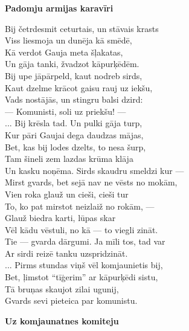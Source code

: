 \documentclass[14pt]{extarticle}
\begin{document}
{{{\bf Padomju armijas karavīri}

Bij četrdesmit ceturtais, un stāvais krasts\\
Viss liesmoja un dunēja kā smēdē,\\
Kā verdot Gauja meta šļakatas,\\
Un gāja tanki, žvadzot kāpurķēdēm.\\
Bij upe jāpārpeld, kaut nodreb sirds,\\
Kaut dzelme krācot gaisu rauj uz iekšu,\\
Vads nostājās, un stingru balsi dzird:\\
--- Komunisti, soli uz priekšu! ---\\
... Bij krēsla tad. Un pulki gāja turp,\\
Kur pāri Gaujai dega daudzas mājas,\\
Bet, kas bij lodes dzelts, to nesa šurp,\\
Tam šineli zem lazdas krūma klāja\\
Un kasku noņēma. Sirds skaudru smeldzi kur ---\\
Mirst gvards, bet sejā nav ne vēsts no mokām,\\
Vien roka glauž un cieši, cieši tur\\
To, ko pat mirstot neizlaiž no rokām, ---\\
Glauž biedra karti, lūpas skar\\
Vēl kādu vēstuli, no kā --- to viegli zināt.\\
Tie --- gvarda dārgumi. Ja mīli tos, tad var\\
Ar sirdi reizē tanku uzspridzināt.\\
... Pirms stundas viņš vēl komjaunietis bij,\\
Bet, ļimstot ``tīģerim'' ar kāpurķēdi sistu,\\
Tā bruņas skaujot zilai ugunij,\\
Gvards sevi pieteica par komunistu. 


\newpage

{\bf Uz komjaunatnes komiteju}

}}
\end{document}
